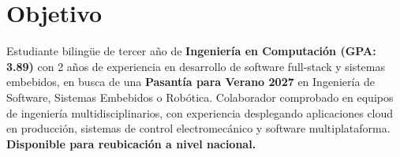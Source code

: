 \section{Objetivo}
Estudiante bilingüe de tercer año de \textbf{Ingeniería en Computación (GPA: 3.89)} con 2 años de experiencia en desarrollo de software full-stack y sistemas embebidos, en busca de una \textbf{Pasantía para Verano 2027} en Ingeniería de Software, Sistemas Embebidos o Robótica. Colaborador comprobado en equipos de ingeniería multidisciplinarios, con experiencia desplegando aplicaciones cloud en producción, sistemas de control electromecánico y software multiplataforma. \textbf{Disponible para reubicación a nivel nacional.}
